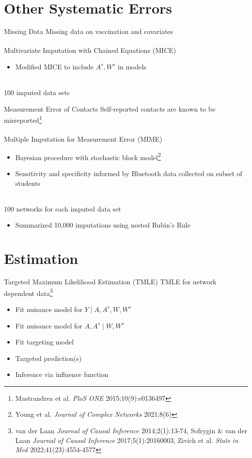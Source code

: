 \documentclass{beamer}
\begin{document}
\section{Other Systematic Errors}

\begin{frame}{Missing Data}
	Missing data on vaccination and covariates
	~\\~\\
	Multivariate Imputation with Chained Equations (MICE)
	\begin{itemize}
		\item Modified MICE to include $A^s,W^s$ in models
	\end{itemize}
	~\\
	100 imputed data sets
\end{frame}

\begin{frame}{Measurement Error of Contacts}
	Self-reported contacts are known to be misreported\footnote[frame]{Mastrandrea et al. \textit{PloS ONE} 2015;10(9):e0136497}
	~\\~\\
	 Multiple Imputation for Measurement Error (MIME)
		\begin{itemize}
			\item Bayesian procedure with stochastic block model\footnote[frame]{Young et al. \textit{Journal of Complex Networks} 2021;8(6)}
			\item Sensitivity and specificity informed by Bluetooth data collected on subset of students
		\end{itemize}
	~\\
	100 networks for each imputed data set
	\begin{itemize}
		\item Summarized 10,000 imputations using nested Rubin's Rule
	\end{itemize}
\end{frame}

\section{Estimation}

\begin{frame}{Targeted Maximum Likelihood Estimation (TMLE)}
	TMLE for network dependent data\footnote[frame]{van der Laan \textit{Journal of Causal Inference} 2014;2(1):13-74, Sofrygin \& van der Laan \textit{Journal of Causal Inference} 2017;5(1):20160003, Zivich et al. \textit{Stats in Med} 2022;41(23):4554-4577}
	\begin{itemize}
		\item[1.] Fit nuisance model for $Y \mid A,A^s,W,W^s$
		\item[2.] Fit nuisance model for $A,A^s \mid W,W^s$
		\item[3.] Fit targeting model
		\item[4.] Targeted prediction(s)
		\item[5.] Inference via influence function
	\end{itemize}
\end{frame}
\end{document}
